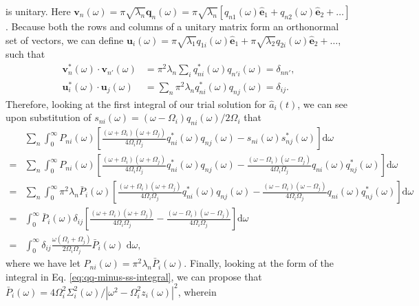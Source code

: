 is unitary. Here $\mathbf{v}_n(\omega) = \pi\sqrt{\lambda_n}\mathbf{q}_n(\omega) = \pi\sqrt{\lambda_n}\left[q_{n1}(\omega)\hat{\mathbf{e}}_1 + q_{n2}(\omega)\hat{\mathbf{e}}_2 + \ldots\right]$. Because both the rows and columns of a unitary matrix form an orthonormal set of vectors, we can define $\mathbf{u}_i(\omega) = \pi\sqrt{\lambda_1}q_{1i}(\omega)\hat{\mathbf{e}}_{1} + \pi\sqrt{\lambda_{2}}q_{2i}(\omega)\hat{\mathbf{e}}_{2} + \ldots$, such that
\begin{equation}
\begin{split}
\mathbf{v}_n^*(\omega)\cdot\mathbf{v}_{n'}(\omega) &= \pi^2\lambda_n\sum_iq_{ni}^*(\omega)q_{n'i}(\omega) = \delta_{nn'},\\
\mathbf{u}_i^*(\omega)\cdot\mathbf{u}_j(\omega) &= \sum_n\pi^2\lambda_nq_{ni}^*(\omega)q_{nj}(\omega) = \delta_{ij}.
\end{split}
\end{equation}
Therefore, looking at the first integral of our trial solution for $\hat{a}_i(t)$, we can see upon substitution of $s_{ni}(\omega) = (\omega - \Omega_i)q_{ni}(\omega)/2\Omega_i$ that
\begin{equation}
\begin{split}
&\sum_n\int_0^\infty P_{ni}(\omega)\left[\frac{(\omega + \Omega_i)(\omega + \Omega_j)}{4\Omega_i\Omega_j}q_{ni}^*(\omega)q_{nj}(\omega) - s_{ni}(\omega)s_{nj}^*(\omega)\right]\mathrm{d}\omega\\
= &\sum_n\int_0^\infty P_{ni}(\omega)\left[\frac{(\omega + \Omega_i)(\omega + \Omega_j)}{4\Omega_i\Omega_j}q_{ni}^*(\omega)q_{nj}(\omega) - \frac{(\omega - \Omega_i)(\omega - \Omega_j)}{4\Omega_i\Omega_j}q_{ni}(\omega)q_{nj}^*(\omega)\right]\mathrm{d}\omega\\
= &\sum_n\int_0^\infty\pi^2\lambda_n\bar{P}_{i}(\omega)\left[\frac{(\omega + \Omega_i)(\omega + \Omega_j)}{4\Omega_i\Omega_j}q_{ni}^*(\omega)q_{nj}(\omega) - \frac{(\omega - \Omega_i)(\omega - \Omega_j)}{4\Omega_i\Omega_j}q_{ni}(\omega)q_{nj}^*(\omega)\right]\mathrm{d}\omega\\
= &\int_0^\infty\bar{P}_{i}(\omega)\delta_{ij}\left[\frac{(\omega + \Omega_i)(\omega + \Omega_j)}{4\Omega_i\Omega_j} - \frac{(\omega - \Omega_i)(\omega - \Omega_j)}{4\Omega_i\Omega_j}\right]\mathrm{d}\omega\\
= &\int_0^\infty\delta_{ij}\frac{\omega(\Omega_i + \Omega_j)}{2\Omega_i\Omega_j}\bar{P}_i(\omega)\;\mathrm{d}\omega,
\end{split}
\end{equation}
where we have let $P_{ni}(\omega) = \pi^2\lambda_n\bar{P}_i(\omega)$. Finally, looking at the form of the integral in Eq. \eqref{eq:qq-minus-ss-integral}, we can propose that $\bar{P}_{i}(\omega) = 4\Omega_i^2 \Sigma_i^2(\omega)/|\omega^2 - \Omega_i^2z_i(\omega)|^2$, wherein
